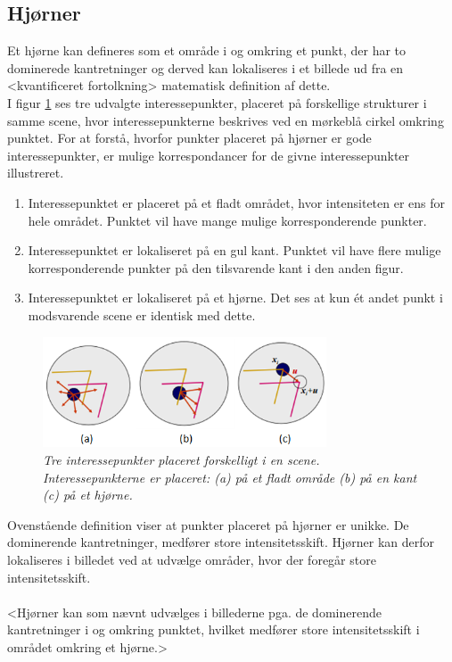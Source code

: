\subsection*{Hjørner}\label{subsec:corner}
Et hjørne kan defineres som et område i og omkring et punkt, der har to dominerede kantretninger og derved kan lokaliseres i et billede ud fra en <kvantificeret fortolkning> matematisk definition af dette. \\ 
I figur \ref{app} ses tre udvalgte interessepunkter, placeret på forskellige strukturer i samme scene, hvor interessepunkterne beskrives ved en mørkeblå cirkel omkring punktet. For at forstå, hvorfor punkter placeret på hjørner er gode interessepunkter, er mulige korrespondancer for de givne interessepunkter illustreret.
\begin{enumerate}[label=\alph*]
\item{Interessepunktet er placeret på et fladt området, hvor intensiteten er ens for hele området. Punktet vil have mange mulige korresponderende punkter.}
\item{Interessepunktet er lokaliseret på en gul kant. Punktet vil have flere mulige korresponderende punkter på den tilsvarende kant i den anden figur.}
\item{Interessepunktet er lokaliseret på et hjørne. Det ses at kun ét andet punkt i modsvarende scene er identisk med dette.}
\end{enumerate}
\begin{figure}[H]
    \centering
    \includegraphics[width=0.75\textwidth]{fig/37.png}
    \vspace{-1em}   
    \begin{center}    
    \caption{{\footnotesize \textit{Tre interessepunkter placeret forskelligt i en scene. Interessepunkterne er placeret: (a) på et fladt område (b) på en kant (c) på et hjørne. 
 }}}
    \label{app}
     \end{center}
    \vspace{-2.7em}  
  \end{figure}  
\noindent
Ovenstående definition viser at punkter placeret på hjørner er unikke. De dominerende kantretninger, medfører store intensitetsskift. Hjørner kan derfor lokaliseres i billedet ved at udvælge områder, hvor der foregår store intensitetsskift. \\ \\
<Hjørner kan som nævnt udvælges i billederne pga. de dominerende kantretninger i og omkring punktet, hvilket medfører store intensitetsskift i området omkring et hjørne.>